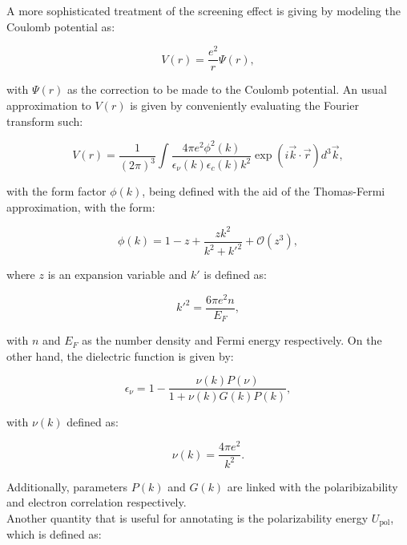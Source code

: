 \documentclass[openany]{book}
\begin{document}
A more sophisticated treatment of the screening effect is giving by modeling the Coulomb potential as:

\begin{equation}\label{eq:potential_screening}
	V(r) = \frac{e^2}{r} \Psi(r),
\end{equation}

with $\Psi(r)$ as the correction to be made to the Coulomb potential. An usual approximation to $V(r)$ is given by conveniently evaluating the Fourier transform such:

\begin{equation}\label{eq:potential_screening_fourier}
	V(r) = \frac{1}{(2\pi)^3} \int \frac{4\pi e^2 \phi^2(k)}{\epsilon_\nu (k) \epsilon_c (k) k^2} \exp(i \vec k \cdot \vec r) d^3 \vec k,
\end{equation}

with the form factor $\phi(k)$, being defined with the aid of the Thomas-Fermi approximation, with the form: 

\begin{equation}\label{eq:potential_screening_formFactor}
	\phi(k) = 1 - z + \frac{zk^2}{k^2 + {k'}^2} + \mathcal{O}(z^3),
\end{equation}

where $z$ is an expansion variable and $k'$ is defined as: 

\begin{equation}\label{eq:potential_screening_kThomasFermi}
	{k'}^2 = \frac{6\pi e^2 n}{E_F},
\end{equation}

with $n$ and $E_F$ as the number density and Fermi energy respectively. On the other hand, the dielectric function is given by:

\begin{equation}\label{eq:potential_screening_dielectric}
	\epsilon_\nu = 1 - \frac{\nu(k) P(\nu)}{1 + \nu(k) G(k) P(k)},
\end{equation}

with $\nu(k)$ defined as: 

\begin{equation}\label{eq:potential_screening_nu}
	\nu(k) = \frac{4\pi e^2}{k^2}.
\end{equation}

Additionally, parameters $P(k)$ and $G(k)$ are linked with the polaribizability and electron correlation respectively. \\

Another quantity that is useful for annotating is the polarizability energy $U_{\mathrm{pol}}$, which is defined as: 
\end{document}
